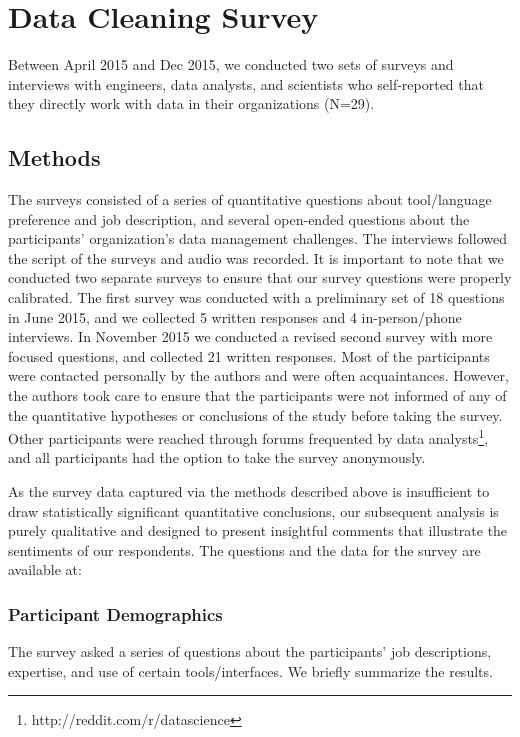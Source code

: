 \section{Data Cleaning Survey}
Between April 2015 and Dec 2015, we conducted two sets of surveys and interviews with engineers, data analysts, and scientists who self-reported that they directly work with data in their organizations (N=29).

\subsection{Methods}\label{sec:survey}
The surveys consisted of a series of quantitative questions about tool/language preference and job description, and several open-ended questions about the participants' organization's data management challenges. The interviews followed the script of the surveys and audio was recorded.
It is important to note that we conducted two separate surveys to ensure that our survey questions were properly calibrated.
The first survey was conducted with a preliminary set of 18 questions in June 2015, and we collected 5 written responses and 4 in-person/phone interviews.
In November 2015 we conducted a revised second survey with  more focused questions, and collected 21 written responses. 
Most of the participants were contacted personally by the authors and were often acquaintances.
However, the authors took care to ensure that the participants were not informed of any of the quantitative hypotheses or conclusions of the study before taking the survey. 
Other participants were reached through forums frequented by data analysts\footnote{http://reddit.com/r/datascience}, and all participants had the option to take the survey anonymously.

As the survey data captured via the methods described above is insufficient to draw statistically significant quantitative conclusions, our subsequent analysis is purely qualitative and designed to present insightful comments that illustrate the sentiments of our respondents. 
The questions and the data for the survey are available at: 

\subsubsection{Participant Demographics}
The survey asked a series of questions about the participants' job descriptions, expertise, and use of certain tools/interfaces.
We briefly summarize the results.

